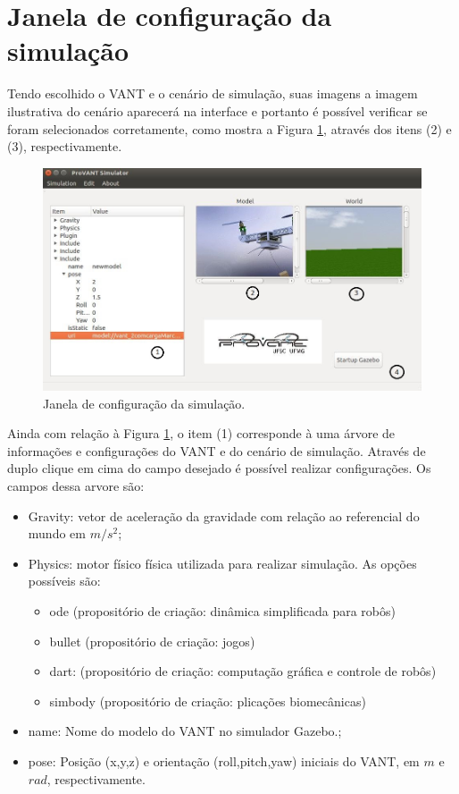 \section{Janela de configuração da simulação}

Tendo escolhido o VANT e o cenário de simulação, suas imagens a imagem ilustrativa do cenário aparecerá na interface e portanto é possível verificar se foram selecionados corretamente, como mostra a Figura \ref{tela_inicial.jpg}, através dos itens (2) e (3), respectivamente. 

\begin{figure}[!ht]
	\centering
	\includegraphics[width=500pt]{figuras/tela_inicial.jpg}
	\caption{Janela de configuração da simulação.}
	\label{tela_inicial.jpg}
\end{figure}

Ainda com relação à Figura \ref{tela_inicial.jpg}, o item (1) corresponde à uma árvore de informações e configurações do VANT e do cenário de simulação. Através de duplo clique em cima do campo desejado é possível realizar configurações. Os campos dessa arvore são:

\begin{itemize}
	\item Gravity: vetor de aceleração da gravidade com relação ao referencial do mundo em $m/s^2$; 
	\item Physics: motor físico física utilizada para realizar simulação. As opções possíveis são:
	\begin{itemize}
		\setlength{\itemsep}{1pt}
		\setlength{\parskip}{0pt}
		\setlength{\parsep}{0pt}
		\item ode (propositório de criação: dinâmica simplificada para robôs)
		\item bullet (propositório de criação: jogos)
		\item dart: (propositório de criação: computação gráfica e controle de robôs)
		\item simbody (propositório de criação: plicações biomecânicas)
	\end{itemize}
	\item name: Nome do modelo do VANT no simulador Gazebo.;
	\item pose: Posição (x,y,z) e orientação (roll,pitch,yaw) iniciais do VANT, em $m$ e $rad$, respectivamente.   
\end{itemize}

